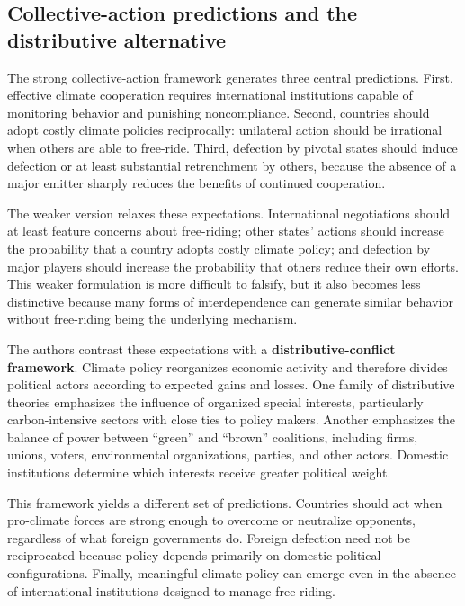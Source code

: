 \subsection{Collective-action predictions and the distributive alternative}

The strong collective-action framework generates three central predictions. First, effective climate cooperation requires international institutions capable of monitoring behavior and punishing noncompliance. Second, countries should adopt costly climate policies reciprocally: unilateral action should be irrational when others are able to free-ride. Third, defection by pivotal states should induce defection or at least substantial retrenchment by others, because the absence of a major emitter sharply reduces the benefits of continued cooperation.

The weaker version relaxes these expectations. International negotiations should at least feature concerns about free-riding; other states' actions should increase the probability that a country adopts costly climate policy; and defection by major players should increase the probability that others reduce their own efforts. This weaker formulation is more difficult to falsify, but it also becomes less distinctive because many forms of interdependence can generate similar behavior without free-riding being the underlying mechanism.

The authors contrast these expectations with a \textbf{distributive-conflict framework}. Climate policy reorganizes economic activity and therefore divides political actors according to expected gains and losses. One family of distributive theories emphasizes the influence of organized special interests, particularly carbon-intensive sectors with close ties to policy makers. Another emphasizes the balance of power between ``green'' and ``brown'' coalitions, including firms, unions, voters, environmental organizations, parties, and other actors. Domestic institutions determine which interests receive greater political weight.

This framework yields a different set of predictions. Countries should act when pro-climate forces are strong enough to overcome or neutralize opponents, regardless of what foreign governments do. Foreign defection need not be reciprocated because policy depends primarily on domestic political configurations. Finally, meaningful climate policy can emerge even in the absence of international institutions designed to manage free-riding.

